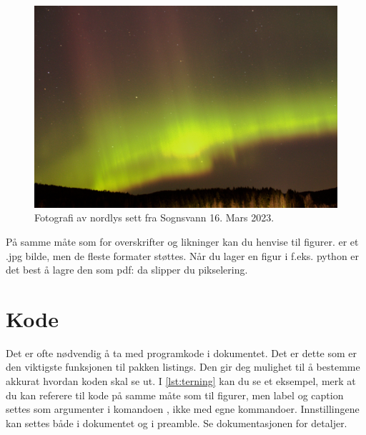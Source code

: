 \begin{figure}[t] %
	\centering  %
	\includegraphics[width=\linewidth]{nordlys.jpg}  %
	\caption{Fotografi av nordlys sett fra Sognsvann 16. Mars 2023.} %
	\label{fig:nordlys} %
\end{figure}

På samme måte som for overskrifter og likninger kan du henvise til figurer. 
er et .jpg bilde, men de fleste formater støttes. Når du lager en figur i f.eks. python er det
best å lagre den som pdf: da slipper du pikselering.

\section{Kode}
Det er ofte nødvendig å ta med programkode i dokumentet. Det er dette som er den viktigste funksjonen til pakken listings. Den gir deg mulighet til å bestemme akkurat hvordan koden skal
se ut. I \cref{lst:terning} kan du se et eksempel, merk at du kan referere til kode på samme
måte som til figurer, men label og caption settes som argumenter i komandoen
\lstinline$$, ikke med egne kommandoer. 
Innstillingene kan settes både i dokumentet og i preamble. Se dokumentasjonen for detaljer.




